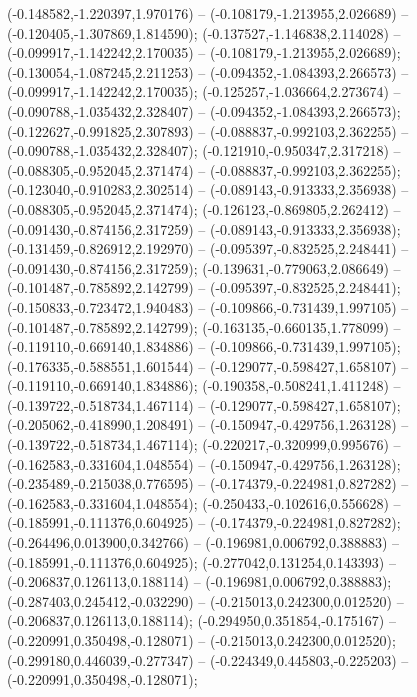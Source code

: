  (-0.148582,-1.220397,1.970176) -- (-0.108179,-1.213955,2.026689) -- (-0.120405,-1.307869,1.814590);
 (-0.137527,-1.146838,2.114028) -- (-0.099917,-1.142242,2.170035) -- (-0.108179,-1.213955,2.026689);
 (-0.130054,-1.087245,2.211253) -- (-0.094352,-1.084393,2.266573) -- (-0.099917,-1.142242,2.170035);
 (-0.125257,-1.036664,2.273674) -- (-0.090788,-1.035432,2.328407) -- (-0.094352,-1.084393,2.266573);
 (-0.122627,-0.991825,2.307893) -- (-0.088837,-0.992103,2.362255) -- (-0.090788,-1.035432,2.328407);
 (-0.121910,-0.950347,2.317218) -- (-0.088305,-0.952045,2.371474) -- (-0.088837,-0.992103,2.362255);
 (-0.123040,-0.910283,2.302514) -- (-0.089143,-0.913333,2.356938) -- (-0.088305,-0.952045,2.371474);
 (-0.126123,-0.869805,2.262412) -- (-0.091430,-0.874156,2.317259) -- (-0.089143,-0.913333,2.356938);
 (-0.131459,-0.826912,2.192970) -- (-0.095397,-0.832525,2.248441) -- (-0.091430,-0.874156,2.317259);
 (-0.139631,-0.779063,2.086649) -- (-0.101487,-0.785892,2.142799) -- (-0.095397,-0.832525,2.248441);
 (-0.150833,-0.723472,1.940483) -- (-0.109866,-0.731439,1.997105) -- (-0.101487,-0.785892,2.142799);
 (-0.163135,-0.660135,1.778099) -- (-0.119110,-0.669140,1.834886) -- (-0.109866,-0.731439,1.997105);
 (-0.176335,-0.588551,1.601544) -- (-0.129077,-0.598427,1.658107) -- (-0.119110,-0.669140,1.834886);
 (-0.190358,-0.508241,1.411248) -- (-0.139722,-0.518734,1.467114) -- (-0.129077,-0.598427,1.658107);
 (-0.205062,-0.418990,1.208491) -- (-0.150947,-0.429756,1.263128) -- (-0.139722,-0.518734,1.467114);
 (-0.220217,-0.320999,0.995676) -- (-0.162583,-0.331604,1.048554) -- (-0.150947,-0.429756,1.263128);
 (-0.235489,-0.215038,0.776595) -- (-0.174379,-0.224981,0.827282) -- (-0.162583,-0.331604,1.048554);
 (-0.250433,-0.102616,0.556628) -- (-0.185991,-0.111376,0.604925) -- (-0.174379,-0.224981,0.827282);
 (-0.264496,0.013900,0.342766) -- (-0.196981,0.006792,0.388883) -- (-0.185991,-0.111376,0.604925);
 (-0.277042,0.131254,0.143393) -- (-0.206837,0.126113,0.188114) -- (-0.196981,0.006792,0.388883);
 (-0.287403,0.245412,-0.032290) -- (-0.215013,0.242300,0.012520) -- (-0.206837,0.126113,0.188114);
 (-0.294950,0.351854,-0.175167) -- (-0.220991,0.350498,-0.128071) -- (-0.215013,0.242300,0.012520);
 (-0.299180,0.446039,-0.277347) -- (-0.224349,0.445803,-0.225203) -- (-0.220991,0.350498,-0.128071);

